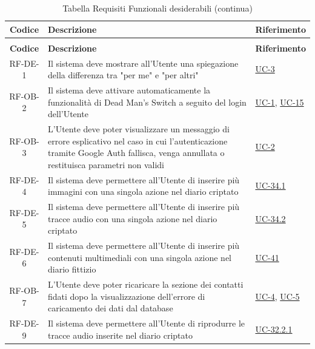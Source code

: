 \documentclass[a4paper,12pt]{article}
\begin{document}
\begin{center}
\renewcommand{\arraystretch}{1.5}
\begin{longtable}{|c|p{8.5cm}|>{\centering\arraybackslash}p{4cm}|}

\hline
\rowcolor{gray!60}
\textbf{Codice} & \textbf{Descrizione} & \textbf{Riferimento} \\
\hline
\endfirsthead
\caption[]{Tabella Requisiti Funzionali desiderabili (continua)} \\
\hline
\rowcolor{gray!60}
\textbf{Codice} & \textbf{Descrizione} & \textbf{Riferimento} \\
\hline
\endhead

\rowcolor{white}
RF-DE-1 & Il sistema deve mostrare all'Utente una spiegazione della differenza tra "per me" e "per altri" & \hyperref[subsec:UC-3]{UC-3} \\
\hline
\rowcolor{gray!20}
RF-OB-2 & Il sistema deve attivare automaticamente la funzionalità di Dead Man's Switch a seguito del login dell'Utente & \hyperref[subsec:UC-1]{UC-1}, \hyperref[sec:UC-15]{UC-15} \\
\hline
\rowcolor{white}
RF-OB-3 & L'Utente deve poter visualizzare un messaggio di errore esplicativo nel caso in cui l'autenticazione tramite Google Auth fallisca, venga annullata o restituisca parametri non validi & \hyperref[subsec:UC-2]{UC-2} \\
\hline
\rowcolor{gray!20}
RF-DE-4 & Il sistema deve permettere all'Utente di inserire più immagini con una singola azione nel diario criptato & \hyperref[subsec:UC-34.1]{UC-34.1} \\
\hline
\rowcolor{white}
RF-DE-5 & Il sistema deve permettere all'Utente di inserire più tracce audio con una singola azione nel diario criptato & \hyperref[subsec:UC-34.2]{UC-34.2} \\
\hline
\rowcolor{gray!20}
RF-DE-6 & Il sistema deve permettere all'Utente di inserire più contenuti multimediali con una singola azione nel diario fittizio & \hyperref[subsec:UC-41]{UC-41} \\
\hline
\rowcolor{white}
RF-OB-7 & L'Utente deve poter ricaricare la sezione dei contatti fidati dopo la visualizzazione dell'errore di caricamento dei dati dal database & \hyperref[sec:UC-4]{UC-4}, \hyperref[sec:UC-5]{UC-5} \\
\hline
\rowcolor{gray!20}
RF-DE-9 & Il sistema deve permettere all'Utente di riprodurre le tracce audio inserite nel diario criptato & \hyperref[subsec:UC-32.2.1]{UC-32.2.1} \\

\end{longtable}
\end{center}
\end{document}

